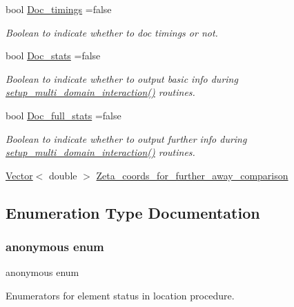 \begin{DoxyCompactItemize}
bool \hyperlink{namespaceoomph_1_1Multi__domain__functions_a64dc4667540a9a2591b00635dea88423}{Doc\+\_\+timings} =false
\begin{DoxyCompactList}\small\item\em Boolean to indicate whether to doc timings or not. \end{DoxyCompactList}\item 
bool \hyperlink{namespaceoomph_1_1Multi__domain__functions_aa490ae6349c68dc3c5b40f6a4a40e718}{Doc\+\_\+stats} =false
\begin{DoxyCompactList}\small\item\em Boolean to indicate whether to output basic info during \hyperlink{namespaceoomph_1_1Multi__domain__functions_ac64183e03f173c69ed6ed6f493a1a67e}{setup\+\_\+multi\+\_\+domain\+\_\+interaction()} routines. \end{DoxyCompactList}\item 
bool \hyperlink{namespaceoomph_1_1Multi__domain__functions_aa5969c7c730e13e9d5a2c268f3045203}{Doc\+\_\+full\+\_\+stats} =false
\begin{DoxyCompactList}\small\item\em Boolean to indicate whether to output further info during \hyperlink{namespaceoomph_1_1Multi__domain__functions_ac64183e03f173c69ed6ed6f493a1a67e}{setup\+\_\+multi\+\_\+domain\+\_\+interaction()} routines. \end{DoxyCompactList}\item 
\hyperlink{classoomph_1_1Vector}{Vector}$<$ double $>$ \hyperlink{namespaceoomph_1_1Multi__domain__functions_a5f14db731fddbd057f4099fbdba95cc0}{Zeta\+\_\+coords\+\_\+for\+\_\+further\+\_\+away\+\_\+comparison}
\end{DoxyCompactItemize}


\subsection{Enumeration Type Documentation}
\mbox{\label{namespaceoomph_1_1Multi__domain__functions_a82a287ab8a3bad9e68edc3437d9dbfb8}} 
\subsubsection{\texorpdfstring{anonymous enum}{anonymous enum}}
{\footnotesize\ttfamily anonymous enum}



Enumerators for element status in location procedure. 

